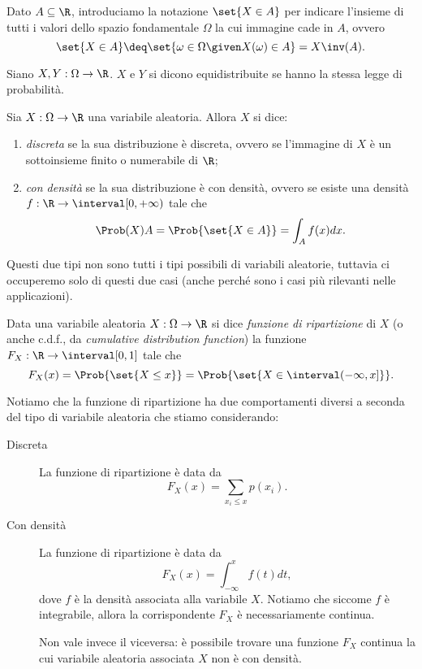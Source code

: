 Dato $A \subseteq \R$, introduciamo la notazione $\set{X \in A}$ per indicare l'insieme di tutti i valori dello spazio fondamentale $\Omega$ la cui immagine cade in $A$, ovvero \[
    \set{X \in A} \deq \set{\omega \in \Omega \given X(\omega) \in A} = X\inv(A).    
\] 

\begin{definition}
     Siano $X, Y : \Omega \to \R$. $X$ e $Y$ si dicono equidistribuite se hanno la stessa legge di probabilità.
\end{definition}

\begin{definition}
     Sia $X : \Omega \to \R$ una variabile aleatoria. Allora $X$ si dice: \begin{enumerate}
        \item \emph{discreta} se la sua distribuzione è discreta, ovvero se l'immagine di $X$ è un sottoinsieme finito o numerabile di $\R$;
        \item \emph{con densità} se la sua distribuzione è con densità, ovvero se esiste una densità $f : \R \to \interval[{0, +\infty})$ tale che \[
            \Prob(X){A} = \Prob{\set{X \in A}} = \int_A f(x)dx.    
        \]
    \end{enumerate}
\end{definition}

Questi due tipi non sono tutti i tipi possibili di variabili aleatorie, tuttavia ci occuperemo solo di questi due casi (anche perché sono i casi più rilevanti nelle applicazioni).

\begin{definition}
    Data una variabile aleatoria $X : \Omega \to \R$ si dice \emph{funzione di ripartizione} di $X$ (o anche c.d.f., da \emph{cumulative distribution function}) la funzione $F_{X} : \R \to \interval[{0,1}]$ tale che \[
        F_{X}(x) = \Prob{\set{X \leq x}} = \Prob{\set{X \in \interval({-\infty, x}]}}.   
    \]
\end{definition}

Notiamo che la funzione di ripartizione ha due comportamenti diversi a seconda del tipo di variabile aleatoria che stiamo considerando: \begin{description}
    \item[Discreta] La funzione di ripartizione è data da \[
        F_X(x) = \sum_{x_i \leq x} p(x_i).    
    \]
    \item[Con densità] La funzione di ripartizione è data da \[
        F_X(x) = \int_{-\infty}^x f(t)dt,   
    \] dove $f$ è la densità associata alla variabile $X$.
    Notiamo che siccome $f$ è integrabile, allora la corrispondente $F_X$ è necessariamente continua.

    Non vale invece il viceversa: è possibile trovare una funzione $F_X$ continua la cui variabile aleatoria associata $X$ non è con densità.
\end{description}

